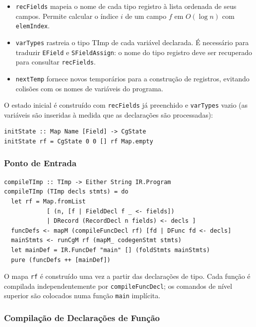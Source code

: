 \begin{itemize}
  \item \texttt{recFields} mapeia o nome de cada tipo registro à lista
    ordenada de seus campos. Permite calcular o índice \(i\) de um campo
    \(f\) em \(O(\log n)\) com \texttt{elemIndex}.
  \item \texttt{varTypes} rastreia o tipo TImp de cada variável declarada.
    É necessário para traduzir \texttt{EField} e \texttt{SFieldAssign}: o
    nome do tipo registro deve ser recuperado para consultar
    \texttt{recFields}.
  \item \texttt{nextTemp} fornece novos temporários para a construção de
    registros, evitando colisões com os nomes de variáveis do programa.
\end{itemize}

O estado inicial é construído com \texttt{recFields} já preenchido e
\texttt{varTypes} vazio (as variáveis são inseridas à medida que as
declarações são processadas):

\begin{verbatim}
initState :: Map Name [Field] -> CgState
initState rf = CgState 0 0 [] rf Map.empty
\end{verbatim}

\subsubsection*{Ponto de Entrada}

\begin{verbatim}
compileTImp :: TImp -> Either String IR.Program
compileTImp (TImp decls stmts) = do
  let rf = Map.fromList
            [ (n, [f | FieldDecl f _ <- fields])
            | DRecord (RecordDecl n fields) <- decls ]
  funcDefs <- mapM (compileFuncDecl rf) [fd | DFunc fd <- decls]
  mainStmts <- runCgM rf (mapM_ codegenStmt stmts)
  let mainDef = IR.FuncDef "main" [] (foldStmts mainStmts)
  pure (funcDefs ++ [mainDef])
\end{verbatim}

O mapa \texttt{rf} é construído uma vez a partir das declarações de tipo.
Cada função é compilada independentemente por \texttt{compileFuncDecl};
os comandos de nível superior são colocados numa função \texttt{main}
implícita.

\subsubsection*{Compilação de Declarações de Função}

